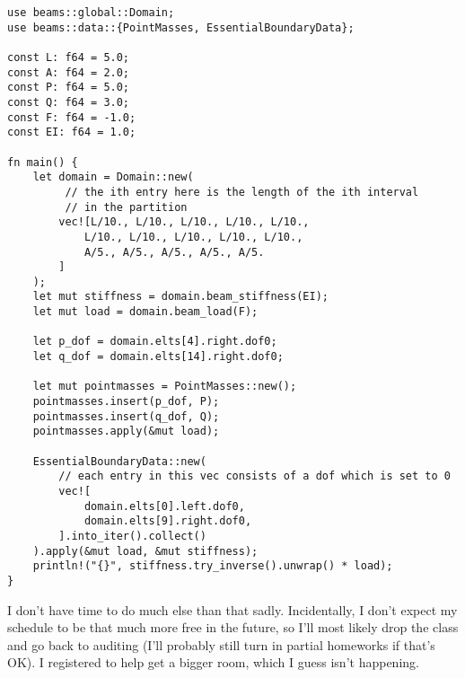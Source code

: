 \documentclass[10pt]{article}
\theoremstyle{definition}
\begin{document}
\begin{verbatim}
use beams::global::Domain;
use beams::data::{PointMasses, EssentialBoundaryData};

const L: f64 = 5.0;
const A: f64 = 2.0;
const P: f64 = 5.0;
const Q: f64 = 3.0;
const F: f64 = -1.0;
const EI: f64 = 1.0;

fn main() {
    let domain = Domain::new(
         // the ith entry here is the length of the ith interval
         // in the partition
        vec![L/10., L/10., L/10., L/10., L/10.,
            L/10., L/10., L/10., L/10., L/10.,
            A/5., A/5., A/5., A/5., A/5.
        ]
    );
    let mut stiffness = domain.beam_stiffness(EI);
    let mut load = domain.beam_load(F);

    let p_dof = domain.elts[4].right.dof0;
    let q_dof = domain.elts[14].right.dof0;
    
    let mut pointmasses = PointMasses::new();
    pointmasses.insert(p_dof, P);
    pointmasses.insert(q_dof, Q);
    pointmasses.apply(&mut load);

    EssentialBoundaryData::new(
        // each entry in this vec consists of a dof which is set to 0
        vec![
            domain.elts[0].left.dof0,
            domain.elts[9].right.dof0, 
        ].into_iter().collect()
    ).apply(&mut load, &mut stiffness);
    println!("{}", stiffness.try_inverse().unwrap() * load);
}
\end{verbatim}

I don't have time to do much else than that sadly.
Incidentally, I don't expect my schedule to be that much more free in the future, so I'll most likely drop the class and go back to auditing (I'll probably still turn in partial homeworks if that's OK).
I registered to help get a bigger room, which I guess isn't happening.
\end{document}

